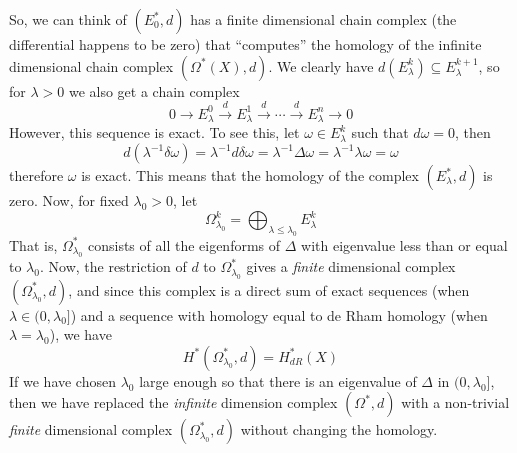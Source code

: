 So, we can think of $(E_0^*,d)$ has a finite dimensional chain complex (the differential happens to be zero) that ``computes'' the homology of the infinite dimensional chain complex $(\Omega^*(X),d)$. We clearly have $d(E_\lambda^k) \subseteq E_\lambda^{k+1}$, so for $\lambda > 0$ we also get a chain complex
\[ 0 \longrightarrow E_\lambda^0 \stackrel{d}{\longrightarrow} E_\lambda^1 \stackrel{d}{\longrightarrow} \cdots \stackrel{d}{\longrightarrow} E_\lambda^n \longrightarrow 0 \]
However, this sequence is exact. To see this, let $\omega \in E_\lambda^k$ such that $d\omega=0$, then
\[ d\left( \lambda^{-1} \delta \omega \right) = \lambda^{-1} d\delta \omega = \lambda^{-1} \Delta \omega = \lambda^{-1} \lambda \omega = \omega \]
therefore $\omega$ is exact. This means that the homology of the complex $(E_\lambda^*,d)$ is zero. Now, for fixed $\lambda_0 > 0$, let 
\[ \Omega_{\lambda_0}^k = \bigoplus_{\lambda \leq \lambda_0} E_\lambda^k \]
That is, $\Omega_{\lambda_0}^*$ consists of all the eigenforms of $\Delta$ with eigenvalue less than or equal to $\lambda_0$. Now, the restriction of $d$ to $\Omega_{\lambda_0}^*$ gives a \emph{finite} dimensional complex $(\Omega_{\lambda_0}^*,d)$, and since this complex is a direct sum of exact sequences (when $\lambda \in (0,\lambda_0]$) and a sequence with homology equal to de Rham homology (when $\lambda=\lambda_0$), we have
\[ H^*( \Omega_{\lambda_0}^*,d ) = H_{dR}^*(X) \]
If we have chosen $\lambda_0$ large enough so that there is an eigenvalue of $\Delta$ in $(0,\lambda_0]$, then we have replaced the \emph{infinite} dimension complex $(\Omega^*,d)$ with a non-trivial \emph{finite} dimensional complex $(\Omega_{\lambda_0}^*,d)$ without changing the homology.

